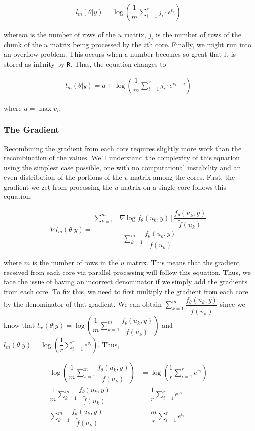 \documentclass{article}
\begin{document}
\begin{align}
l_m(\theta|y) = \log(\dfrac{1}{m}\sum\limits_{i=1}^r j_i \cdot e^{v_i})
\end{align}

\noindent where$m$ is the number of rows of the $u$ matrix, $j_i$ is the number of rows of the chunk of the $u$ matrix being processed by the $i$th core. Finally, we might run into an overflow problem. This occurs when a number becomes so great that it is stored as infinity by \texttt{R}. Thus, the equation changes to 

\begin{align}
l_m(\theta|y) = a + \log(\dfrac{1}{m}\sum\limits_{i=1}^r j_i \cdot e^{v_i - a})
\end{align}

\noindent where $a = \max{v_i}$.

\subsubsection{The Gradient}
Recombining the gradient from each core requires slightly more work than the recombination of the values. We'll understand the complexity of this equation using the simplest case possible, one with no computational instability and an even distribution of the portions of the $u$ matrix among the cores. First, the gradient we get from processing the $u$ matrix on a single core follows this equation: 

\begin{align}
\nabla l_m(\theta|y)=
\dfrac{\sum_{k=1}^m   \left[  \nabla  \log f_\theta(u_k,y) \right]  \dfrac{f_\theta(u_k,y)}{\tilde{f}(u_k)} }{\sum_{k=1}^m  \dfrac{f_\theta(u_k,y)}{\tilde{f}(u_k)}  } 
\end{align}

\noindent where $m$ is the number of rows in the $u$ matrix. This means that the gradient received from each core via parallel processing will follow this equation. Thus, we face the issue of having an incorrect denominator if we simply add the gradients from each core. To fix this, we need to first multiply the gradient from each core by the denominator of that gradient. We can obtain $\sum_{k=1}^m  \dfrac{f_\theta(u_k,y)}{\tilde{f}(u_k)}$ since we know that $l_{m}(\theta|y) = \log \left( \dfrac{1}{m} \sum_{k=1}^m  \dfrac{ f_\theta(u_k,y)   }{\tilde{f}(u_k)} \right)$ and $l_m(\theta|y) = \log(\dfrac{1}{r}\sum\limits_{i=1}^r e^{v_i})$. Thus, 

\begin{align}
\log \left( \dfrac{1}{m} \sum_{k=1}^m  \dfrac{ f_\theta(u_k,y)   }{\tilde{f}(u_k)} \right) &= \log(\dfrac{1}{r}\sum\limits_{i=1}^r e^{v_i}) \\
\dfrac{1}{m} \sum_{k=1}^m  \dfrac{ f_\theta(u_k,y)   }{\tilde{f}(u_k)}  &= \dfrac{1}{r}\sum\limits_{i=1}^r e^{v_i} \\
\sum_{k=1}^m  \dfrac{ f_\theta(u_k,y)   }{\tilde{f}(u_k)}  &= \dfrac{m}{r} \sum\limits_{i=1}^r e^{v_i}
\end{align}
\end{document}
